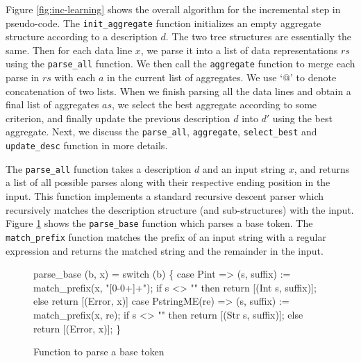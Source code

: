 Figure \ref{fig:inc-learning} shows the overall algorithm for the incremental step in
pseudo-code. The {\tt init\_aggregate} function initializes an empty aggregate
structure according to a description $d$. The two tree structures are essentially the
same. Then for each data line $x$, we parse it into a list of data representations $rs$
using the {\tt parse\_all} function. We then call the {\tt aggregate} function to merge
each parse in $rs$ with each $a$ in the current list of aggregates. We use `@' to denote
concatenation of two lists. When we finish
parsing all the data lines and obtain a final list of aggregates $as$, we select
the best aggregate according to some criterion, and finally update the previous description
$d$ into $d'$ using the best aggregate. Next, we discuss the {\tt parse\_all},
{\tt aggregate}, {\tt select\_best} and {\tt update\_desc} function in more details.

%
The {\tt parse\_all} function takes a description $d$ and an input string $x$, and returns
a list of all possible parses along with their respective ending position in the input. 
This function implements a standard recursive descent parser which recursively matches the
description structure (and sub-structures) with the input. Figure \ref{fig:parse_base}
shows the {\tt parse\_base} function which parses a base token. The {\tt match\_prefix}
function matches the prefix of an input string with a regular expression and returns
the matched string and the remainder in the input.

\begin{figure}[t]
\begin{codebox}
parse_base (b, x) =
  switch (b) \{
    case Pint => 
      (s, suffix) := match_prefix(x, "[0-0+\-]+");
      if s <> "" then return [(Int s, suffix)];
      else return [(Error, x)]
    case PstringME(re) => 
      (s, suffix) := match_prefix(x, re);
      if s <> "" then return [(Str s, suffix)];
      else return [(Error, x)];
  \}
\end{codebox}
\caption{Function to parse a base token} \label{fig:parse_base}
\end{figure}

